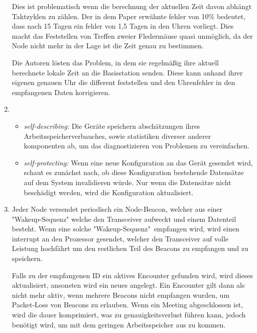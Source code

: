\begin{enumerate}
        Dies ist problematisch wenn die berechnung der aktuellen Zeit davon abhängt Taktzyklen zu zählen. Der in dem Paper erwähnte fehler von 10\% bedeutet, dass nach 15 Tagen ein fehler von 1,5 Tagen in den Uhren vorliegt. Dies macht das Feststellen von Treffen zweier Fledermäuse quasi unmöglich, da der Node nicht mehr in der Lage ist die Zeit genau zu bestimmen.

        Die Autoren lösten das Problem, in dem sie regelmäßig ihre aktuell berechnete lokale Zeit an die Basisstation senden. Diese kann anhand ihrer eigenen genauen Uhr die different feststellen und den Uhrenfehler in den empfangenen Daten korrigieren.

        \item \begin{itemize}
            \item \emph{self-describing:} Die Geräte speichern abschätzungen ihres Arbeitsspeicherverbauches, sowie statistiken diverser anderer komponenten ab, um das diagnostizieren von Problemen zu vereinfachen.
            \item \emph{self-protecting:} Wenn eine neue Konfiguration an das Gerät gesendet wird, schaut es zunächst nach, ob diese Konfiguration bestehende Datensätze auf dem System invalidieren würde. Nur wenn die Datensätze nicht beschädigt werden, wird die Konfiguration aktualisiert.
        \end{itemize}

        \item Jeder Node versendet periodisch ein Node-Beacon, welcher aus einer "Wakeup-Sequenz" welche den Transceiver aufweckt und einem Datenteil besteht. Wenn eine solche "Wakeup-Sequenz"\, empfangen wird, wird einen interrupt an den Prozessor gesendet, welcher den Transceiver auf volle Leistung hochfährt um den restlichen Teil des Beacons zu empfangen und zu speichern.

        Falls zu der empfangenen ID ein aktives Encounter gefunden wird, wird dieses aktualisiert, ansonsten wird ein neues angelegt. Ein Encounter gilt dann als nicht mehr aktiv, wenn mehrere Beacons nicht empfangen wurden, um Packet-Loss von Beacons zu erlauben. Wenn ein Meeting abgeschlossen ist, wird die dauer komprimiert, was zu genauigkeitsverlust führen kann, jedoch benötigt wird, um mit dem geringen Arbeitsspeicher aus zu kommen.

    \end{enumerate}
